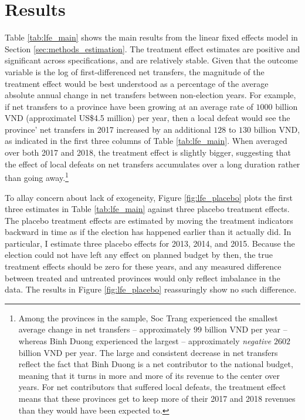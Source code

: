 \documentclass[12pt]{article}
\newcommand{\1}{\mathbbm{1}}
\begin{document}


\section{Results}
\label{sec:results}


Table \ref{tab:lfe_main} shows the main results from the linear fixed effects model in Section \ref{sec:methods_estimation}. The treatment effect estimates are positive and significant across specifications, and are relatively stable. Given that the outcome variable is the log of first-differenced net transfers, the magnitude of the treatment effect would be best understood as a percentage of the average absolute annual change in net transfers between non-election years. For example, if net transfers to a province have been growing at an average rate of $1000$ billion VND (approximatel US\$4.5 million) per year, then a local defeat would see the province' net transfers in 2017 increased by an additional $128$ to $130$ billion VND, as indicated in the first three columns of Table \ref{tab:lfe_main}. When averaged over both 2017 and 2018, the treatment effect is slightly bigger, suggesting that the effect of local defeats on net transfers accumulates over a long duration rather than going away.\footnote{Among the provinces in the sample, Soc Trang experienced the smallest average change in net transfers -- approximately $99$ billion VND per year -- whereas Binh Duong experienced the largest -- approximately \textit{negative} $2602$ billion VND per year. The large and consistent decrease in net transfers reflect the fact that Binh Duong is a net contributor to the national budget, meaning that it turns in more and more of its revenue to the center over years. For net contributors that suffered local defeats, the treatment effect means that these provinces get to keep more of their 2017 and 2018 revenues than they would have been expected to.}

To allay concern about lack of exogeneity, Figure \ref{fig:lfe_placebo} plots the first three estimates in Table \ref{tab:lfe_main} against three placebo treatment effects. The placebo treatment effects are estimated by moving the treatment indicators backward in time as if the election has happened earlier than it actually did. In particular, I estimate three placebo effects for 2013, 2014, and 2015. Because the election could not have left any effect on planned budget by then, the true treatment effects should be zero for these years, and any measured difference between treated and untreated provinces would only reflect imbalance in the data. The results in Figure \ref{fig:lfe_placebo} reassuringly show no such difference.
\end{document}
